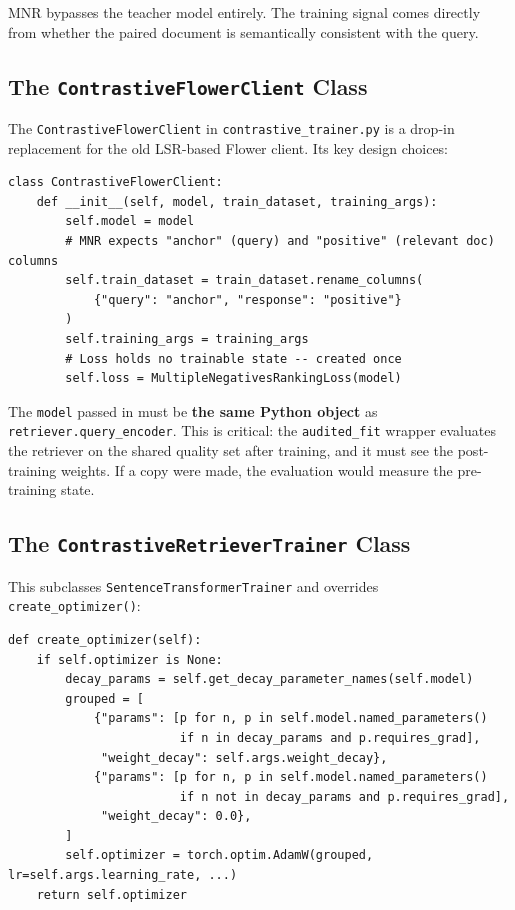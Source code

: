 \documentclass[12pt,a4paper]{article}
\begin{document}
MNR bypasses the teacher model entirely. The training signal comes directly from whether the paired document is semantically consistent with the query.

\subsection{The \texttt{ContrastiveFlowerClient} Class}

The \texttt{ContrastiveFlowerClient} in \texttt{contrastive\_trainer.py} is a drop-in replacement for the old LSR-based Flower client. Its key design choices:

\begin{lstlisting}[caption={ContrastiveFlowerClient initialisation}]
class ContrastiveFlowerClient:
    def __init__(self, model, train_dataset, training_args):
        self.model = model
        # MNR expects "anchor" (query) and "positive" (relevant doc) columns
        self.train_dataset = train_dataset.rename_columns(
            {"query": "anchor", "response": "positive"}
        )
        self.training_args = training_args
        # Loss holds no trainable state -- created once
        self.loss = MultipleNegativesRankingLoss(model)
\end{lstlisting}

The \texttt{model} passed in must be \textbf{the same Python object} as \texttt{retriever.query\_encoder}. This is critical: the \texttt{audited\_fit} wrapper evaluates the retriever on the shared quality set after training, and it must see the post-training weights. If a copy were made, the evaluation would measure the pre-training state.

\subsection{The \texttt{ContrastiveRetrieverTrainer} Class}

This subclasses \texttt{SentenceTransformerTrainer} and overrides \texttt{create\_optimizer()}:

\begin{lstlisting}[caption={Optimizer override in ContrastiveRetrieverTrainer}]
def create_optimizer(self):
    if self.optimizer is None:
        decay_params = self.get_decay_parameter_names(self.model)
        grouped = [
            {"params": [p for n, p in self.model.named_parameters()
                        if n in decay_params and p.requires_grad],
             "weight_decay": self.args.weight_decay},
            {"params": [p for n, p in self.model.named_parameters()
                        if n not in decay_params and p.requires_grad],
             "weight_decay": 0.0},
        ]
        self.optimizer = torch.optim.AdamW(grouped, lr=self.args.learning_rate, ...)
    return self.optimizer
\end{lstlisting}
\end{document}
